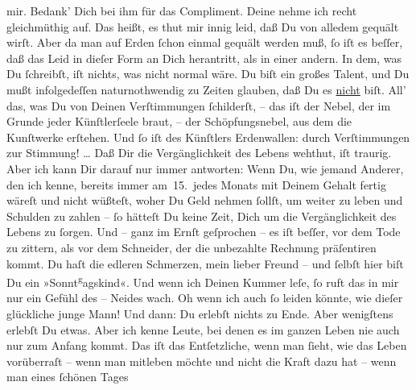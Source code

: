\begin{ledgroupsized}[t]{13cm}
               mir. Bedank’ Dich bei ihm für das Compliment.\pend
           \pstart
           Deine \label{K_L02765-7v}\label{K_L02765-7h} nehme ich recht gleichmüthig auf. Das heißt, es thut mir innig leid, daß Du
               von alledem gequält wirſt. Aber da man auf  Erden ſchon einmal gequält werden muß, ſo iſt es beſſer, daß das Leid
               in dieſer Form an Dich herantritt, als in einer andern. In dem, was Du
               ſchreibſt, iſt nichts, was nicht normal wäre. Du biſt ein großes Talent, und Du mußt
               infolgedeſſen naturnothwendig zu Zeiten glauben, daß Du es \uline{nicht} biſt. All’ das, was Du von Deinen Verſtimmungen ſchilderſt, – das iſt
               der  Nebel, der im Grunde jeder Künſtlerſeele
               braut,  – der Schöpfungsnebel, aus dem die
               Kunſtwerke erſtehen. Und ſo iſt des Künſtlers Erdenwallen: durch Verſtimmungen zur
               Stimmung! {\dots} Daß Dir {\pb}die
               Vergänglichkeit des Lebens wehthut, iſt traurig. Aber ich kann Dir darauf nur immer
               antworten: Wenn Du, wie jemand Anderer, den ich kenne, bereits immer am 15. jedes
               Monats mit Deinem Gehalt fertig wäreſt und nicht wüßteſt, woher Du Geld nehmen
               ſollſt, um weiter zu leben und Schulden zu zahlen – ſo hätteſt Du keine Zeit, Dich um
               die Vergänglichkeit des Lebens zu ſorgen. Und – ganz im Ernſt geſprochen – es iſt
               beſſer, vor dem Tode zu zittern, als vor {\pb}dem
               Schneider, der die unbezahlte Rechnung präſentiren kommt. Du haſt die edleren
               Schmerzen, mein lieber Freund – und ſelbſt hier biſt Du ein »Sonnt\substVorne{}\textsuperscript{g}\substDazwischen{}a\substHinten{}gskind«. Und wenn ich Deinen Kummer leſe, ſo ruft das in mir nur ein Gefühl
               des – Neides wach. Oh wenn ich auch ſo  leiden
               könnte, wie dieſer glückliche junge Mann! Und dann: Du erlebſt nichts zu Ende. Aber
               wenigſtens erlebſt Du etwas. Aber ich kenne {\pb}Leute,
               bei  denen es im ganzen Leben nie auch nur zum
               Anfang kommt. Das iſt das Entſetzliche, wenn man ſieht, wie das Leben vorüberraſt –
               wenn man mitleben möchte und nicht die Kraft dazu hat – wenn man eines ſchönen Tages

\end{ledgroupsized}
